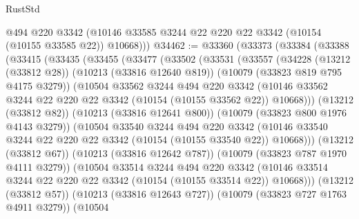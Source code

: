 \begin{lexlean}{RustStd}
\begin{coremodule}
        @494
        @220
        @3342
        (@10146 @33585 @3244 @22 @220 @22 @3342 (@10154 (@10155 @33585 @22)) @10668)))
@34462 := @33360
    (@33373
      (@33384
        (@33388
          (@33415
            (@33435
              (@33455
                (@33477
                  (@33502
                    (@33531
                      (@33557
                        (@34228
                          (@13212 (@33812 @28))
                          (@10213 (@33816 @12640 @819))
                          (@10079 (@33823 @819 @795 @4175 @3279))
                          (@10504
                            @33562
                            @3244
                            @494
                            @220
                            @3342
                            (@10146
                              @33562
                              @3244
                              @22
                              @220
                              @22
                              @3342
                              (@10154 (@10155 @33562 @22))
                              @10668)))
                        (@13212 (@33812 @82))
                        (@10213 (@33816 @12641 @800))
                        (@10079 (@33823 @800 @1976 @4143 @3279))
                        (@10504
                          @33540
                          @3244
                          @494
                          @220
                          @3342
                          (@10146
                            @33540
                            @3244
                            @22
                            @220
                            @22
                            @3342
                            (@10154 (@10155 @33540 @22))
                            @10668)))
                      (@13212 (@33812 @67))
                      (@10213 (@33816 @12642 @787))
                      (@10079 (@33823 @787 @1970 @4111 @3279))
                      (@10504
                        @33514
                        @3244
                        @494
                        @220
                        @3342
                        (@10146
                          @33514
                          @3244
                          @22
                          @220
                          @22
                          @3342
                          (@10154 (@10155 @33514 @22))
                          @10668)))
                    (@13212 (@33812 @57))
                    (@10213 (@33816 @12643 @727))
                    (@10079 (@33823 @727 @1763 @4911 @3279))
                    (@10504

\end{coremodule}
\end{lexlean}
